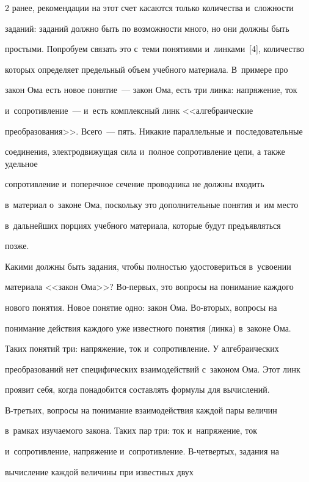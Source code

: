 \begin{multicols}{2}
ранее, рекомендации на этот счет касаются только количества и~слож\-ности 


заданий: заданий должно быть по возможности много, но они должны быть 


простыми. Попробуем связать это с~теми понятиями и~линками~[4], количество 


которых определяет предельный объем учебного материала. В~примере про 


закон Ома есть новое понятие~--- закон Ома, есть три линка: напряжение, ток 


и~сопротивление~--- и~есть комплексный линк <<алгебраические 


преобразования>>. Всего~--- пять. Никакие параллельные и~последовательные 


соединения, электродвижущая сила и~полное сопротивление цепи, а также удельное 


сопротивление и~поперечное сечение проводника не должны входить 


в~материал о~законе Ома, поскольку это дополнительные понятия и~им место 


в~дальнейших порциях учебного материала, которые будут предъявляться 


позже. 


  


  Какими должны быть задания, чтобы пол\-ностью удостовериться в~усвоении 


материала <<закон Ома>>? Во-пер\-вых, это вопросы на понимание каж\-до\-го 


нового понятия. Новое понятие одно: закон Ома. Во-вто\-рых, вопросы на 


понимание действия каждого уже известного понятия (линка) в~законе Ома. 


Таких понятий три: напряжение, ток и~сопротивление. У алгебраических 


преобразований нет специфических взаимодействий с~законом Ома. Этот линк 


проявит себя, когда понадобится со\-став\-лять формулы для вычислений.  


В-третьих, вопросы на понимание взаимодействия каждой пары величин 


в~рамках изучаемого закона. Таких пар три: ток и~напряжение, ток 


и~сопротивление, напряжение и~сопротивление. В-чет\-вер\-тых, задания на 


вычисление каждой величины при известных двух %



\end{multicols}
